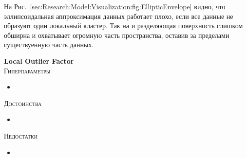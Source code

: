 \documentclass[12pt]{article}
\begin{document}
    \par На Рис.~\ref{sec:Research:Model:Visualization:fig:EllipticEnvelope} видно, что эллипсоидальная аппроксимация данных работает плохо, если все данные не образуют один локальный кластер. Так на  и  разделяющая поверхность слишком обширна и охватывает огромную часть пространства, оставив за пределами существуенную часть данных.

    \newpage


    \textbf{Local Outlier Factor} \\

    \noindent \textsc{Гиперпараметры}
    \begin{itemize}
        \item 
    \end{itemize}

    \noindent \textsc{Достоинства}
    \begin{itemize}
        \item 
    \end{itemize}
    
    \noindent \textsc{Недостатки}
    \begin{itemize}
        \item 
    \end{itemize}
\end{document}

